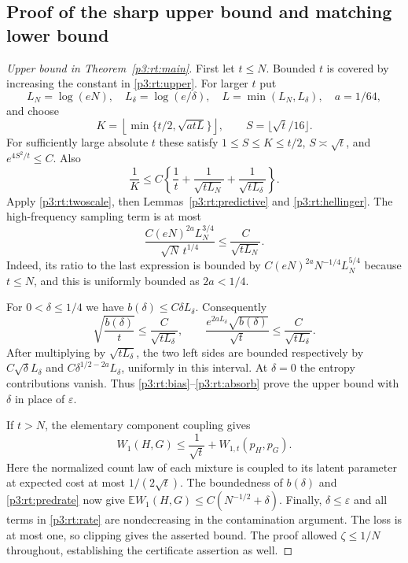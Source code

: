 \documentclass[11pt,a4paper]{article}
\theoremstyle{definition}
\theoremstyle{remark}
\numberwithin{equation}{section}
\begin{document}
\subsection{Proof of the sharp upper bound and matching lower bound}

\begin{proof}[Upper bound in Theorem~\ref{p3:rt:main}]
First let $t\le N$.  Bounded $t$ is covered by increasing the constant
in \eqref{p3:rt:upper}.  For larger $t$ put
\[
 L_N=\log(eN),\quad L_\delta=\log(e/\delta),\quad
 L=\min(L_N,L_\delta),\quad a=1/64,
\]
and choose
\[
 K=\left\lfloor\min\{t/2,\sqrt{atL}\}\right\rfloor,
 \qquad S=\lfloor\sqrt t/16\rfloor.
\]
For sufficiently large absolute $t$ these satisfy
$1\le S\le K\le t/2$, $S\asymp\sqrt t$, and
$e^{4S^2/t}\le C$.  Also
\begin{equation}\label{p3:rt:bias}
 \frac1K\le C\left\{\frac1t+
        \frac1{\sqrt{tL_N}}+\frac1{\sqrt{tL_\delta}}\right\}.
\end{equation}
Apply \eqref{p3:rt:twoscale}, then Lemmas~\ref{p3:rt:predictive} and
\ref{p3:rt:hellinger}.  The high-frequency sampling term is at most
\[
 \frac{C(eN)^{2a}L_N^{3/4}}{\sqrt N\,t^{1/4}}
                                      \le\frac C{\sqrt{tL_N}}.
\]
Indeed, its ratio to the last expression is bounded by
$C(eN)^{2a}N^{-1/4}L_N^{5/4}$ because $t\le N$, and this is uniformly
bounded as $2a<1/4$.

For $0<\delta\le1/4$ we have $b(\delta)\le C\delta L_\delta$.
Consequently
\begin{equation}\label{p3:rt:absorb}
 \sqrt{\frac{b(\delta)}t}\le\frac C{\sqrt{tL_\delta}},\qquad
 \frac{e^{2aL_\delta}\sqrt{b(\delta)}}{\sqrt t}
                                      \le\frac C{\sqrt{tL_\delta}}.
\end{equation}
After multiplying by $\sqrt{tL_\delta}$, the two left sides are
bounded respectively by $C\sqrt\delta L_\delta$ and
$C\delta^{1/2-2a}L_\delta$, uniformly in this interval.  At
$\delta=0$ the entropy contributions vanish.  Thus
\eqref{p3:rt:bias}--\eqref{p3:rt:absorb} prove the upper bound with
$\delta$ in place of $\varepsilon$.

If $t>N$, the elementary component coupling gives
\[
 W_1(H,G)\le\frac1{\sqrt t}+W_{1,t}(p_H,p_G).
\]
Here the normalized count law of each mixture is coupled to its latent
parameter at expected cost at most $1/(2\sqrt t)$.  The boundedness
of $b(\delta)$ and \eqref{p3:rt:predrate} now give
$\mathbb EW_1(H,G)\le C(N^{-1/2}+\delta)$.
Finally, $\delta\le\varepsilon$ and all terms in
\eqref{p3:rt:rate} are nondecreasing in the contamination argument.
The loss is at most one, so clipping gives the asserted bound.
The proof allowed $\zeta\le1/N$ throughout, establishing the
certificate assertion as well.
\end{proof}
\end{document}
